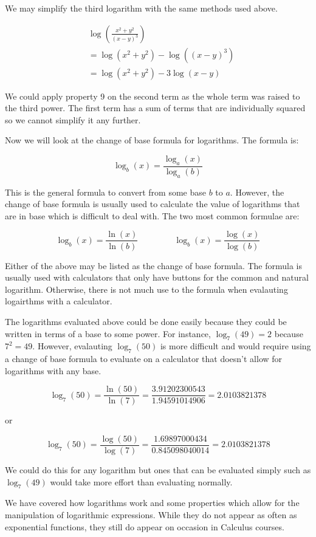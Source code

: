 \documentclass[12pt]{article}
\theoremstyle{definition}
\begin{document}
We may simplify the third logarithm with the same methods used above.

\begin{align}
     & \log\left(\frac{x^2+y^2}{(x-y)^3}\right) \\
     & = \log(x^2+y^2) - \log((x-y)^3)          \\
     & = \log(x^2+y^2) - 3\log(x-y)
\end{align}

We could apply property 9 on the second term as the whole term was raised to the third power.
The first term has a sum of terms that are individually squared so we cannot simplify it any further.

Now we will look at the change of base formula for logarithms.
The formula is:

\begin{equation}
    \log_b(x) = \frac{\log_a(x)}{\log_a(b)}
\end{equation}

This is the general formula to convert from some base $b$ to $a$.
However, the change of base formula is usually used to calculate the value of logarithms that are in base which is difficult to deal with.
The two most common formulae are:

\begin{equation}
    \log_b(x) = \frac{\ln(x)}{\ln(b)} \qquad~\qquad \log_b(x) = \frac{\log(x)}{\log(b)}
\end{equation}

Either of the above may be listed as the change of base formula.
The formula is usually used with calculators that only have buttons for the common and natural logarithm.
Otherwise, there is not much use to the formula when evalauting logairthms with a calculator.

The logarithms evaluated above could be done easily because they could be written in terms of a base to some power.
For instance, $\log_7(49)=2$ because $7^2=49$.
However, evalauting $\log_7(50)$ is more difficult and would require using a change of base formula to evaluate on a calculator that doesn't allow for logarithms with any base.

\begin{equation}
    \log_7(50) = \frac{\ln(50)}{\ln(7)} = \frac{3.91202300543}{1.94591014906} = 2.0103821378
\end{equation}

or

\begin{equation}
    \log_7(50) = \frac{\log(50)}{\log(7)} = \frac{1.69897000434}{0.845098040014} = 2.0103821378
\end{equation}

We could do this for any logarithm but ones that can be evaluated simply such as $\log_7(49)$ would take more effort than evaluating normally.

We have covered how logarithms work and some properties which allow for the manipulation of logarithmic expressions.
While they do not appear as often as exponential functions, they still do appear on occasion in Calculus courses.
\end{document}
